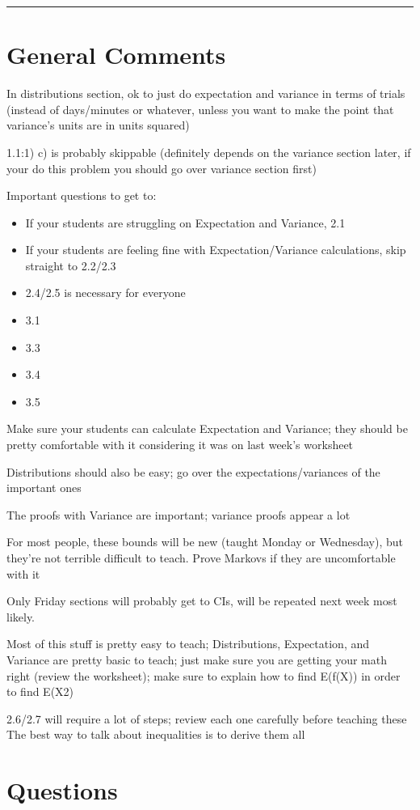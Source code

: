 \documentclass{exam}
\title{}
\date{Distributions, Variance, Inequalities, Confidence Intervals}
\begin{document}
\maketitle
\rule{\textwidth}{0.15em}
\fontsize{12}{15}\selectfont
\thispagestyle{empty}


\section{General Comments}
\begin{questions}
\item In distributions section, ok to just do expectation and variance in terms of trials (instead of days/minutes or whatever, unless you want to make the point that variance’s units are in units squared)
\item 1.1:1) c) is probably skippable (definitely depends on the variance section later, if your do this problem you should go over variance section first)
\item Important questions to get to:
\begin{itemize}
\item If your students are struggling on Expectation and Variance, 2.1
\item If your students are feeling fine with Expectation/Variance calculations, skip straight to 2.2/2.3
\item 2.4/2.5 is necessary for everyone
\item 3.1
\item 3.3
\item 3.4
\item 3.5
\end{itemize}

\item Make sure your students can calculate Expectation and Variance; they should be pretty  comfortable with it considering it was on last week's worksheet
\item Distributions should also be easy; go over the expectations/variances of the important ones
\item The proofs with Variance are important; variance proofs appear a lot
\item For most people, these bounds will be new (taught Monday or Wednesday), but they’re not terrible difficult to teach. Prove Markovs if they are uncomfortable with it
\item Only Friday sections will probably get to CIs, will be repeated next week most likely. 

\item Most of this stuff is pretty easy to teach; Distributions, Expectation, and Variance are pretty basic to teach; just make sure you are getting your math right (review the worksheet); make sure to explain how to find E(f(X)) in order to find E(X2)
\item 2.6/2.7 will require a lot of steps; review each one carefully before teaching these
The best way to talk about inequalities is to derive them all
\end{questions}

\section{Questions}
 
\end{document}
